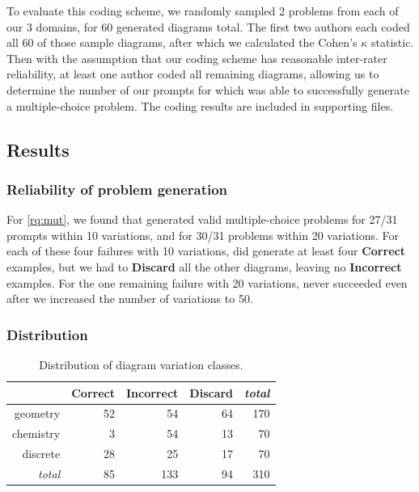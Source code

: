 To evaluate this coding scheme, we randomly sampled 2 problems from each of our 3 domains, for 60 generated diagrams total. The first two authors each coded all 60 of those sample diagrams, after which we calculated the Cohen's $\kappa$ \cite{cohen1960coefficient} statistic. Then with the assumption that our coding scheme has reasonable inter-rater reliability, at least one author coded all remaining diagrams, allowing us to determine the number of our prompts for which \Edgeworth was able to successfully generate a multiple-choice problem. The coding results are included in supporting files.

\subsection{Results}

\subsubsection{Reliability of problem generation}

For \ref{rq:mut}, we found that \Edgeworth generated valid multiple-choice problems for 27/31 prompts within 10 variations, and for 30/31 problems within 20 variations. For each of these four failures with 10 variations, \Edgeworth did generate at least four \textbf{Correct} examples, but we had to \textbf{Discard} all the other diagrams, leaving no \textbf{Incorrect} examples. For the one remaining failure with 20 variations, \Edgeworth never succeeded even after we increased the number of variations to 50.


\subsubsection{Distribution}

\begin{table}
    \centering
    \begin{tabular}{r|rrr|r}
        & \textbf{Correct} & \textbf{Incorrect} & \textbf{Discard} & \textit{total} \\
        \hline
        geometry & 52 & 54 & 64 & 170 \\
        chemistry & 3 & 54 & 13 & 70 \\
        discrete & 28 & 25 & 17 & 70 \\
        \hline
        \textit{total} & 85 & 133 & 94 & 310
    \end{tabular}
    \caption{Distribution of diagram variation classes.}
    \label{tab:distribution}
\end{table}

